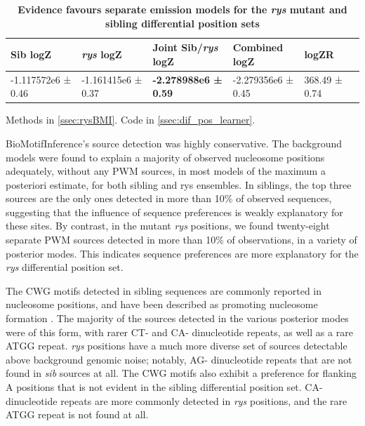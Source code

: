 \documentclass{ut-thesis}
\begin{document}
\begin{NoHyper}
\begin{table}[!ht]
    \centering
    \caption{{\bf Evidence favours separate emission models for the \textit{rys} mutant and sibling differential position sets}}
    \begin{tabular}{|l|l|l|l|l|l|}
        \hline {\bf Sib logZ} & {\bf \textit{rys} logZ} & {\bf Joint Sib/\textit{rys} logZ} & {\bf Combined logZ} & {\bf logZR} \\ \hline
        -1.117572e6 ± 0.46 & -1.161415e6 ± 0.37 & {\bf -2.278988e6 ± 0.59} & -2.279356e6 ± 0.45 &  368.49 ± 0.74 \\ \hline
        \end{tabular}
    \begin{flushleft}
        Methods in \autoref{ssec:rysBMI}.
        Code in \autoref{ssec:dif_pos_learner}.
    \end{flushleft}
    \label{BMIevidencetable}
\end{table}

BioMotifInference's source detection was highly conservative. The background models were found to explain a majority of observed nucleosome positions adequately, without any PWM sources, in most models of the maximum a posteriori estimate, for both sibling and rys ensembles. In siblings, the top three sources are the only ones detected in more than 10\% of observed sequences, suggesting that the influence of sequence preferences is weakly explanatory for these sites. By contrast, in the mutant \textit{rys} positions, we found twenty-eight separate PWM sources detected in more than 10\% of observations, in a variety of posterior modes. This indicates sequence preferences are more explanatory for the \textit{rys} differential position set.

The CWG motifs detected in sibling sequences are commonly reported in nucleosome positions, and have been described as promoting nucleosome formation \cite{Hasan2003}. The majority of the sources detected in the various posterior modes were of this form, with rarer CT- and CA- dinucleotide repeats, as well as a rare ATGG repeat. \textit{rys} positions have a much more diverse set of sources detectable above background genomic noise; notably, AG- dinucleotide repeats that are not found in \textit{sib} sources at all. The CWG motifs also exhibit a preference for flanking A positions that is not evident in the sibling differential position set. CA- dinucleotide repeats are more commonly detected in \textit{rys} positions, and the rare ATGG repeat is not found at all.


\end{NoHyper}
\end{document}
